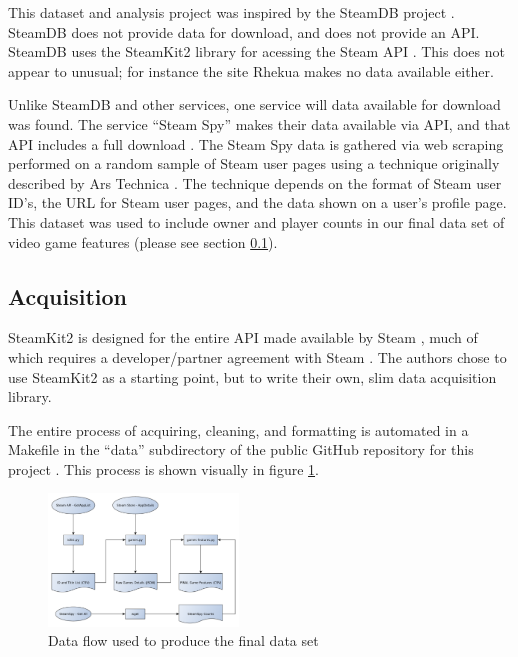 \documentclass[letterpaper,10pt,twocolumn]{article}
\begin{document}
This dataset and analysis project was inspired by the SteamDB project
\cite{steamdb}. SteamDB does not provide data for download, and does not
provide an API. SteamDB uses the SteamKit2 library \cite{steamkit} for
acessing the Steam API \cite{steamdb-faq}. This does not appear to unusual;
for instance the site Rhekua \cite{rhekua} makes no data available either.

Unlike SteamDB and other services, one service will data available for
download was found. The service ``Steam Spy'' makes their data available via
API, and that API includes a full download \cite{steamspy}. The Steam Spy data
is gathered via web scraping performed on a random sample of Steam user pages
using a technique originally described by Ars Technica
\cite{steamspy-about,steamgauge}. The technique depends on the format of Steam
user ID's, the URL for Steam user pages, and the data shown on a user's
profile page. This dataset was used to include owner and player counts in our
final data set of video game features (please see section \ref{data-grab}).

\subsection{Acquisition}

\label{data-grab}

SteamKit2 is designed for the entire API made available by Steam
\cite{steamkit}, much of which requires a developer/partner agreement with
Steam \cite{steam-dev}. The authors chose to use SteamKit2 as a starting point,
but to write their own, slim data acquisition library.

The entire process of acquiring, cleaning, and formatting is automated in a
Makefile in the ``data'' subdirectory of the public GitHub repository for this
project \cite{our-github}. This process is shown visually in figure
\ref{fig:data-flow}.

\begin{figure}[H]
    \caption{Data flow used to produce the final data set}
    \label{fig:data-flow}
    \includegraphics[width=0.45\textwidth,keepaspectratio]{data-flow}
\end{figure}
\end{document}
